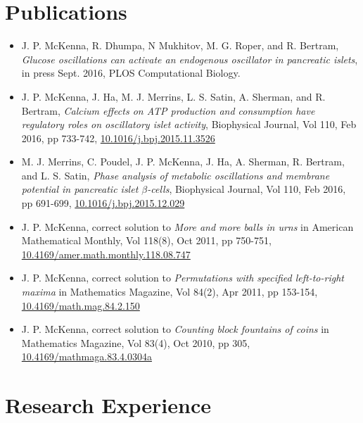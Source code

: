 \documentclass[11pt]{cv}
\begin{document}
\section*{Publications}
\label{sec:orgheadline6}
\begin{itemize}
\item J. P. McKenna, R. Dhumpa, N Mukhitov, M. G. Roper, and R. Bertram, \emph{Glucose oscillations can activate an endogenous oscillator in pancreatic islets}, in press Sept. 2016, PLOS Computational Biology.\\
\item J. P. McKenna, J. Ha, M. J. Merrins, L. S. Satin, A. Sherman, and R. Bertram, \emph{Calcium effects on ATP production and consumption have regulatory roles on oscillatory islet activity}, Biophysical Journal, Vol 110, Feb 2016, pp 733-742, \href{http://dx.doi.org/10.1016/j.bpj.2015.11.3526}{10.1016/j.bpj.2015.11.3526}\\
\item M. J. Merrins, C. Poudel, J. P. McKenna, J. Ha, A. Sherman, R. Bertram, and L. S. Satin, \emph{Phase analysis of metabolic oscillations and membrane potential in pancreatic islet \(\beta\)-cells}, Biophysical Journal, Vol 110, Feb 2016, pp 691-699, \href{http://dx.doi.org/10.1016/j.bpj.2015.12.029}{10.1016/j.bpj.2015.12.029}\\
\item J. P. McKenna, correct solution to \emph{More and more balls in urns} in American Mathematical Monthly, Vol 118(8), Oct 2011, pp 750-751, \href{http://dx.doi.org/10.4169/amer.math.monthly.118.08.747}{10.4169/amer.math.monthly.118.08.747}\\
\item J. P. McKenna, correct solution to \emph{Permutations with specified left-to-right maxima} in Mathematics Magazine, Vol 84(2), Apr 2011, pp 153-154, \href{http://dx.doi.org/10.4169/math.mag.84.2.150}{10.4169/math.mag.84.2.150}\\
\item J. P. McKenna, correct solution to \emph{Counting block fountains of coins} in Mathematics Magazine, Vol 83(4), Oct 2010, pp 305, \href{http://www.jstor.org/stable/10.4169/mathmaga.83.4.0304a}{10.4169/mathmaga.83.4.0304a}\\
\end{itemize}
\section*{Research Experience}
\label{sec:orgheadline10}
\end{document}
